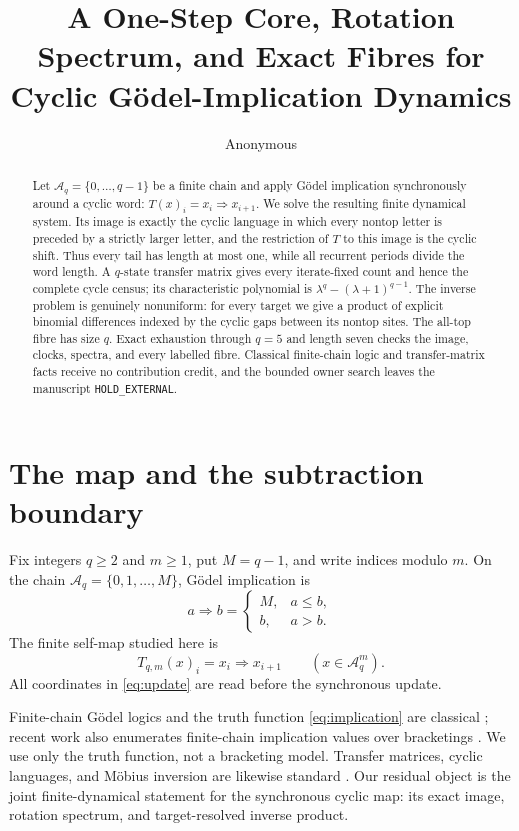 \documentclass[a4paper,10pt]{amsart}
\title[Cyclic G\"odel-implication dynamics]{A One-Step Core, Rotation
Spectrum, and Exact Fibres for Cyclic G\"odel-Implication Dynamics}
\author{Anonymous}
\date{}
\theoremstyle{remark}
\newcommand{\A}{\mathcal A}
\begin{document}
\begin{abstract}
Let $\A_q=\{0,\ldots,q-1\}$ be a finite chain and apply G\"odel
implication synchronously around a cyclic word:
$T(x)_i=x_i\Rightarrow x_{i+1}$.  We solve the resulting finite dynamical
system.  Its image is exactly the cyclic language in which every nontop
letter is preceded by a strictly larger letter, and the restriction of $T$
to this image is the cyclic shift.  Thus every tail has length at most one,
while all recurrent periods divide the word length.  A $q$-state transfer
matrix gives every iterate-fixed count and hence the complete cycle census;
its characteristic polynomial is
$\lambda^q-(\lambda+1)^{q-1}$.  The inverse problem is genuinely
nonuniform: for every target we give a product of explicit binomial
differences indexed by the cyclic gaps between its nontop sites.  The
all-top fibre has size $q$.  Exact exhaustion through $q=5$ and length seven
checks the image, clocks, spectra, and every labelled fibre.  Classical
finite-chain logic and transfer-matrix facts receive no contribution credit,
and the bounded owner search leaves the manuscript
\texttt{HOLD\_EXTERNAL}.
\end{abstract}

\maketitle

\section{The map and the subtraction boundary}

Fix integers $q\ge2$ and $m\ge1$, put $M=q-1$, and write indices modulo
$m$.  On the chain $\A_q=\{0,1,\ldots,M\}$, G\"odel implication is
\begin{equation}\label{eq:implication}
 a\Rightarrow b=\begin{cases}M,&a\le b,\\ b,&a>b.\end{cases}
\end{equation}
The finite self-map studied here is
\begin{equation}\label{eq:update}
 T_{q,m}(x)_i=x_i\Rightarrow x_{i+1}
 \qquad (x\in\A_q^m).
\end{equation}
All coordinates in \eqref{eq:update} are read before the synchronous update.

Finite-chain G\"odel logics and the truth function \eqref{eq:implication}
are classical \cite{Dummett1959,Hajek1998}; recent work also enumerates
finite-chain implication values over bracketings \cite{Yildiz2026}.  We use
only the truth function, not a bracketing model.  Transfer matrices, cyclic
languages, and M\"obius inversion are likewise standard
\cite{LindMarcus1995,Stanley2011}.  Our residual object is the joint
finite-dynamical statement for the synchronous cyclic map: its exact image,
rotation spectrum, and target-resolved inverse product.
\end{document}
